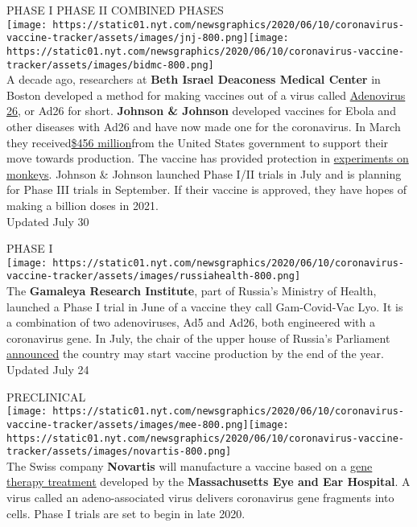 PHASE I PHASE II COMBINED PHASES\\
\texttt{[image: https://static01.nyt.com/newsgraphics/2020/06/10/coronavirus-vaccine-tracker/assets/images/jnj-800.png]}\texttt{[image: https://static01.nyt.com/newsgraphics/2020/06/10/coronavirus-vaccine-tracker/assets/images/bidmc-800.png]}\\
A decade ago, researchers at \textbf{Beth Israel Deaconess Medical
Center} in Boston developed a method for making vaccines out of a virus
called
\href{https://www.nytimes.com/2020/07/17/health/coronavirus-vaccine-johnson-janssen.html}{Adenovirus
26}, or Ad26 for short. \textbf{Johnson \& Johnson} developed vaccines
for Ebola and other diseases with Ad26 and have now made one for the
coronavirus. In March they
received\href{https://www.jnj.com/johnson-johnson-announces-a-lead-vaccine-candidate-for-covid-19-landmark-new-partnership-with-u-s-department-of-health-human-services-and-commitment-to-supply-one-billion-vaccines-worldwide-for-emergency-pandemic-use}{\$456
million}from the United States government to support their move towards
production. The vaccine has provided protection in
\href{https://www.nytimes.com/2020/07/30/health/covid-19-vaccine-monkeys.html}{experiments
on monkeys}. Johnson \& Johnson launched Phase I/II trials in July and
is planning for Phase III trials in September. If their vaccine is
approved, they have hopes of making a billion doses in 2021.\\
Updated July 30

PHASE I\\
\texttt{[image: https://static01.nyt.com/newsgraphics/2020/06/10/coronavirus-vaccine-tracker/assets/images/russiahealth-800.png]}\\
The \textbf{Gamaleya Research Institute}, part of Russia's Ministry of
Health, launched a Phase I trial in June of a vaccine they call
Gam-Covid-Vac Lyo. It is a combination of two adenoviruses, Ad5 and
Ad26, both engineered with a coronavirus gene. In July, the chair of the
upper house of Russia's Parliament
\href{https://tass.com/society/1181659}{announced} the country may start
vaccine production by the end of the year.\\
Updated July 24

PRECLINICAL\\
\texttt{[image: https://static01.nyt.com/newsgraphics/2020/06/10/coronavirus-vaccine-tracker/assets/images/mee-800.png]}\texttt{[image: https://static01.nyt.com/newsgraphics/2020/06/10/coronavirus-vaccine-tracker/assets/images/novartis-800.png]}\\
The Swiss company \textbf{Novartis} will manufacture a vaccine based on
a
\href{https://www.nytimes.com/2020/05/04/health/gene-therapy-harvard-coronavirus.html}{gene
therapy treatment} developed by the \textbf{Massachusetts Eye and Ear
Hospital}. A virus called an adeno-associated virus delivers coronavirus
gene fragments into cells. Phase I trials are set to begin in late 2020.

